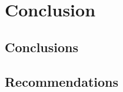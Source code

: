 \graphicspath{{7_Conclusion/}}
\chapter{Conclusion}
\label{chap:conclusion}

\begin{chapter-abstract}
\blindtext
\end{chapter-abstract}

\clearpage
\Materialtrue %

\section{Conclusions}\label{conclusion:sec:conclusions}

\blindtext

\section{Recommendations}\label{conclusion:sec:recommendations}

\blindtext 